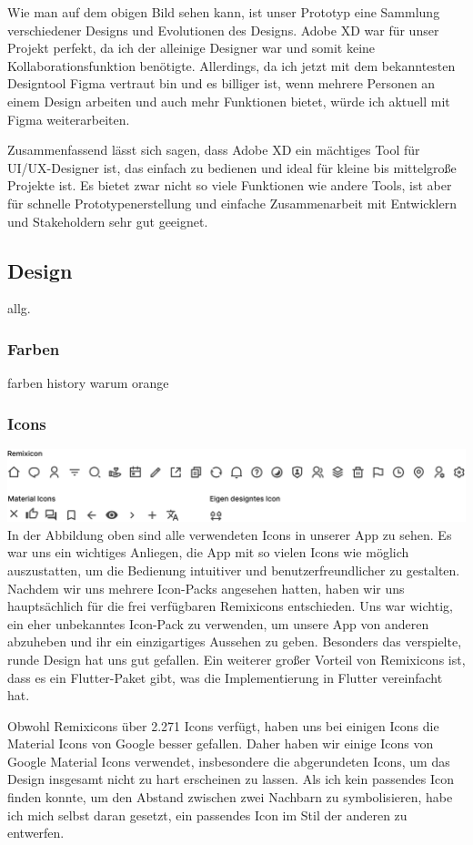 Wie man auf dem obigen Bild sehen kann, ist unser Prototyp
eine Sammlung verschiedener Designs und Evolutionen des
Designs. Adobe XD war für unser Projekt perfekt, da ich der
alleinige Designer war und somit keine
Kollaborationsfunktion benötigte. Allerdings, da ich jetzt
mit dem bekanntesten Designtool Figma vertraut bin und es billiger ist, wenn mehrere
Personen an einem Design arbeiten und auch mehr Funktionen
bietet, würde ich aktuell mit Figma weiterarbeiten.

Zusammenfassend lässt sich sagen, dass Adobe XD ein mächtiges Tool für UI/UX-Designer ist, das einfach zu bedienen und ideal für kleine bis mittelgroße Projekte ist. Es bietet zwar nicht so viele Funktionen wie andere Tools, ist aber für schnelle Prototypenerstellung und einfache Zusammenarbeit mit Entwicklern und Stakeholdern sehr gut geeignet.

\subsection{Design}
allg.


\subsubsection{Farben}
farben history
warum orange
\subsubsection{Icons}
\includegraphics[width=1\textwidth]{pics/icons.png}
In der Abbildung oben sind alle verwendeten Icons in unserer App zu sehen. Es war uns ein wichtiges Anliegen, die App mit so vielen Icons wie möglich auszustatten, um die Bedienung intuitiver und benutzerfreundlicher zu gestalten. Nachdem wir uns mehrere Icon-Packs angesehen hatten, haben wir uns hauptsächlich für die frei verfügbaren Remixicons entschieden. Uns war wichtig, ein eher unbekanntes Icon-Pack zu verwenden, um unsere App von anderen abzuheben und ihr ein einzigartiges Aussehen zu geben. Besonders das verspielte, runde Design hat uns gut gefallen. Ein weiterer großer Vorteil von Remixicons ist, dass es ein Flutter-Paket gibt, was die Implementierung in Flutter vereinfacht hat.

Obwohl Remixicons über 2.271 Icons verfügt, haben uns bei einigen Icons die Material Icons von Google besser gefallen. Daher haben wir einige Icons von Google Material Icons verwendet, insbesondere die abgerundeten Icons, um das Design insgesamt nicht zu hart erscheinen zu lassen. Als ich kein passendes Icon finden konnte, um den Abstand zwischen zwei Nachbarn zu symbolisieren, habe ich mich selbst daran gesetzt, ein passendes Icon im Stil der anderen zu entwerfen.
